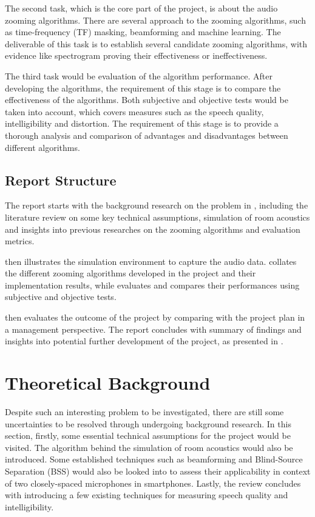 \documentclass[a4paper,twoside,12pt,hidelinks]{article}
\begin{document}
The second task, which is the core part of the project, is about the audio zooming algorithms. There are several approach to the zooming algorithms, such as time-frequency (TF) masking, beamforming and machine learning. The deliverable of this task is to establish several candidate zooming algorithms, with evidence like spectrogram proving their effectiveness or ineffectiveness.

The third task would be evaluation of the algorithm performance. After developing the algorithms, the requirement of this stage is to compare the effectiveness of the algorithms. Both subjective and objective tests would be taken into account, which covers measures such as the speech quality, intelligibility and distortion. The requirement of this stage is to provide a thorough analysis and comparison of advantages and disadvantages between different algorithms.

\subsection{Report Structure}
The report starts with the background research on the problem in \textbf{}, including the literature review on some key technical assumptions, simulation of room acoustics and insights into previous researches on the zooming algorithms and evaluation metrics. 

\textbf{} then illustrates the simulation environment to capture the audio data. \textbf{} collates the different zooming algorithms developed in the project and their implementation results, while \textbf{} evaluates and compares their performances using subjective and objective tests.

\textbf{} then evaluates the outcome of the project by comparing with the project plan in a management perspective. The report concludes with summary of findings and insights into potential further development of the project, as presented in \textbf{}.
\newpage
\section{Theoretical Background}
\label{sect:background}
Despite such an interesting problem to be investigated, there are still some uncertainties to be resolved through undergoing background research. In this section, firstly, some essential technical assumptions for the project would be visited. The algorithm behind the simulation of room acoustics would also be introduced. Some established techniques such as beamforming and Blind-Source Separation (BSS) would also be looked into to assess their applicability in context of two closely-spaced microphones in smartphones. Lastly, the review concludes with introducing a few existing techniques for measuring speech quality and intelligibility.
\end{document}
